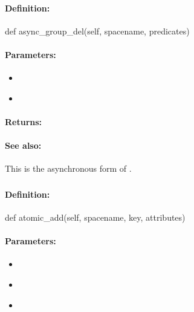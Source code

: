 \paragraph{Definition:}
\begin{pythoncode}
def async_group_del(self, spacename, predicates)
\end{pythoncode}

\paragraph{Parameters:}
\begin{itemize}[noitemsep]
\item {}\\

\item {}\\

\end{itemize}

\paragraph{Returns:}


\paragraph{See also:}  This is the asynchronous form of .

\pagebreak
\subsubsection{}
\label{api:python:atomic_add}


\paragraph{Definition:}
\begin{pythoncode}
def atomic_add(self, spacename, key, attributes)
\end{pythoncode}

\paragraph{Parameters:}
\begin{itemize}[noitemsep]
\item {}\\

\item {}\\

\item {}\\

\end{itemize}

